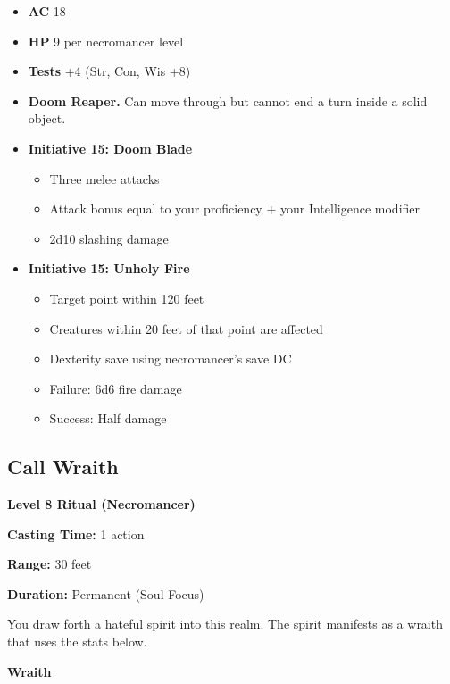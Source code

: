 \documentclass[12pt,letterpaper,twocolumn,openany,nodeprecatedcode,bg=none]{dndbook}
\providecommand{\tightlist}{%
  \setlength{\itemsep}{0pt}\setlength{\parskip}{0pt}}
\begin{document}
\begin{itemize}
\tightlist
\item
  \textbf{AC} 18
\item
  \textbf{HP} 9 per necromancer level
\item
  \textbf{Tests} +4 (Str, Con, Wis +8)
\item
  \textbf{Doom Reaper.} Can move through but cannot end a turn inside a
  solid object.
\item
  \textbf{Initiative 15: Doom Blade}

  \begin{itemize}
  \tightlist
  \item
    Three melee attacks
  \item
    Attack bonus equal to your proficiency + your Intelligence modifier
  \item
    2d10 slashing damage
  \end{itemize}
\item
  \textbf{Initiative 15: Unholy Fire}

  \begin{itemize}
  \tightlist
  \item
    Target point within 120 feet
  \item
    Creatures within 20 feet of that point are affected
  \item
    Dexterity save using necromancer's save DC
  \item
    Failure: 6d6 fire damage
  \item
    Success: Half damage
  \end{itemize}
\end{itemize}

\subsection{Call Wraith}\label{call-wraith}

\textbf{Level 8 Ritual (Necromancer)}

\textbf{Casting Time:} 1 action

\textbf{Range:} 30 feet

\textbf{Duration:} Permanent (Soul Focus)

You draw forth a hateful spirit into this realm. The spirit manifests as
a wraith that uses the stats below.

\textbf{Wraith}
\end{document}
